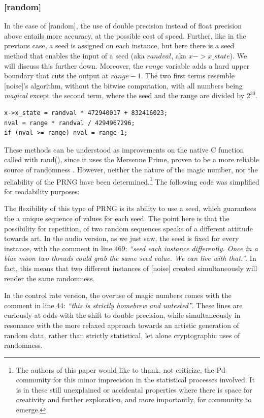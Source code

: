 \documentclass{nime-alternate}
\begin{document}
\subsubsection{[random]}
In the case of [random], the use of double precision instead of float precision above entails more accuracy, at the possible cost of speed. Further, like in the previous case, a seed is assigned on each instance, but here there is a seed method that enables the input of a seed (aka \(randval\), aka \(x->x\_state\)). We will discuss this further down. Moreover, the \(range\) variable adds a hard upper boundary that cuts the output at \(range-1\). The two first terms resemble [noise\ttt]'s algorithm, without the bitwise computation, with all numbers being \textit{magical} except the second term, where the seed and the range are divided by \(2^{30}\).
\begin{lstlisting}    
x->x_state = randval * 472940017 + 832416023;
nval = range * randval / 4294967296;
if (nval >= range) nval = range-1;
\end{lstlisting}
These methods can be understood as improvements on the native C function called with rand(), since it uses the Mersenne Prime, proven to be a more reliable source of randomness \cite{matsumoto:twister}. However, neither the nature of the magic number, nor the reliability of the PRNG have been determined.\footnote{The authors of this paper would like to thank, not criticize, the Pd community for this minor imprecision in the statistical processes involved. It is in these still unexplained or accidental properties where there is space for creativity and further exploration, and more importantly, for community to emerge.} The following code was simplified for readability purposes:

The flexibility of this type of PRNG is its ability to use a seed, which guarantees the a unique sequence of values for each seed. The point here is that the possibility for repetition, of two random sequences speaks of a different attitude towards art. In the audio version, as we just saw, the seed is fixed for every instance, with the comment in line 469: \textit{``seed each instance differently.  Once in a blue moon two threads could grab the same seed value.  We can live with that.''}. In fact, this means that two different instances of [noise\ttt] created simultaneously will render the same randomness. 

In the control rate version, the overuse of magic numbers comes with the comment in line 44: \textit{``this is strictly homebrew and untested''}. These lines are curiously at odds with the shift to double precision, while simultaneously in resonance with the more relaxed approach towards an artistic generation of random data, rather than strictly statistical, let alone cryptographic uses of randomness.
\end{document}
